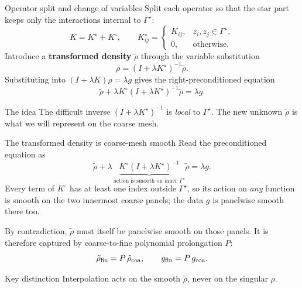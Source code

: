 \documentclass[aspectratio=169,11pt]{beamer}
\newcommand{\hl}[1]{{\color{CCMorange}\textbf{#1}}}
\begin{document}
\begin{frame}{Operator split and change of variables}
\small
Split each operator so that the star part keeps only the interactions internal
to $\Gamma^\star$:
\[
  K=K^\star+K^\circ,\qquad
  K^\star_{ij}=
  \begin{cases}K_{ij}, & z_i,z_j\in\Gamma^\star,\\[2pt] 0,&\text{otherwise.}\end{cases}
\]
Introduce a \hl{transformed density} $\tilde\rho$ through the variable
substitution
\[
  \rho=(I+\lambda K^\star)^{-1}\tilde\rho.
\]
Substituting into $(I+\lambda K)\rho=\lambda g$ gives the right-preconditioned
equation
\[
  \tilde\rho+\lambda K^\circ(I+\lambda K^\star)^{-1}\tilde\rho=\lambda g.
\]

\begin{block}{The idea}
The difficult inverse $(I+\lambda K^\star)^{-1}$ is \emph{local} to
$\Gamma^\star$.  The new unknown $\tilde\rho$ is what we will represent on the
coarse mesh.
\end{block}
\end{frame}

\begin{frame}{The transformed density is coarse-mesh smooth}
\small
Read the preconditioned equation as
\[
  \tilde\rho+\lambda\,\underbrace{K^\circ(I+\lambda K^\star)^{-1}}_{\text{action is smooth on inner }\Gamma^\star}\tilde\rho=\lambda g.
\]
Every term of $K^\circ$ has at least one index outside $\Gamma^\star$, so its
action on \emph{any} function is smooth on the two innermost coarse panels; the
data $g$ is panelwise smooth there too.

\vspace{1mm}
By contradiction, $\tilde\rho$ must itself be panelwise smooth on those panels.
It is therefore captured by coarse-to-fine polynomial prolongation $P$:
\[
  \tilde\rho_{\rm fin}=P\,\tilde\rho_{\rm coa},
  \qquad
  g_{\rm fin}=P\,g_{\rm coa}.
\]

\begin{block}{Key distinction}
Interpolation acts on the smooth $\tilde\rho$, never on the singular $\rho$.
\end{block}
\end{frame}
\end{document}
